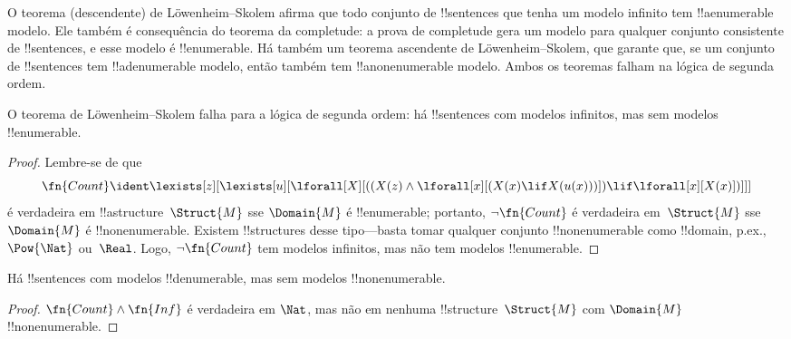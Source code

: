 \documentclass[../../../include/open-logic-section]{subfiles}
\begin{document}


\begin{explain}
O teorema (descendente) de L\"owenheim--Skolem afirma que todo conjunto de
!!{sentence}s que tenha um modelo infinito tem !!a{enumerable} modelo. Ele
também é consequência do teorema da completude: a prova de completude gera
um modelo para qualquer conjunto consistente de !!{sentence}s, e esse
modelo é !!{enumerable}. Há também um teorema ascendente de
L\"owenheim--Skolem, que garante que, se um conjunto de !!{sentence}s tem
!!a{denumerable} modelo, então também tem !!a{nonenumerable} modelo. Ambos
os teoremas falham na lógica de segunda ordem.
\end{explain}


\begin{thm}
 O teorema de L\"owenheim--Skolem falha para a
lógica de segunda ordem: há !!{sentence}s com modelos infinitos, mas sem
modelos !!{enumerable}.
\end{thm}

\begin{proof}
Lembre-se de que
\[
\fn{Count} \ident \lexists[z][\lexists[u][\lforall[X][((X(z) \land
      \lforall[x][(X(x) \lif X(u(x)))]) \lif \lforall[x][X(x)])]]]
\]
é verdadeira em !!a{structure}~$\Struct{M}$ sse $\Domain{M}$ é
!!{enumerable}; portanto, $\lnot\fn{Count}$ é verdadeira em~$\Struct{M}$
sse $\Domain{M}$ é !!{nonenumerable}. Existem !!{structure}s desse
tipo---basta tomar qualquer conjunto !!{nonenumerable} como !!{domain}, p.ex., $\Pow{\Nat}$ ou~$\Real$. Logo, $\lnot \fn{Count}$ tem modelos
infinitos, mas não tem modelos !!{enumerable}.
\end{proof}

\begin{thm}
Há !!{sentence}s com modelos !!{denumerable}, mas sem modelos
!!{nonenumerable}.
\end{thm}

\begin{proof}
$\fn{Count} \land \fn{Inf}$ é verdadeira em $\Nat$, mas não em nenhuma
  !!{structure}~$\Struct{M}$ com $\Domain{M}$ !!{nonenumerable}.
\end{proof}
\end{document}
